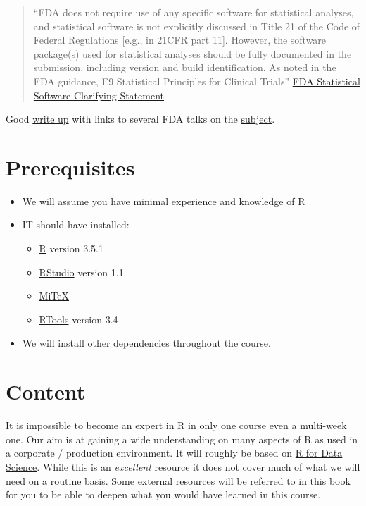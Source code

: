 \documentclass[]{book}
\providecommand{\tightlist}{%
  \setlength{\itemsep}{0pt}\setlength{\parskip}{0pt}}
\theoremstyle{definition}
\theoremstyle{definition}
\theoremstyle{definition}
\theoremstyle{remark}
\begin{document}
\begin{quote}
``FDA does not require use of any specific software for statistical
analyses, and statistical software is not explicitly discussed in Title
21 of the Code of Federal Regulations {[}e.g., in 21CFR part 11{]}.
However, the software package(s) used for statistical analyses should be
fully documented in the submission, including version and build
identification. As noted in the FDA guidance, E9 Statistical Principles
for Clinical Trials''
\href{https://www.fda.gov/downloads/forindustry/datastandards/studydatastandards/ucm587506.pdf}{FDA
Statistical Software Clarifying Statement}
\end{quote}

Good \href{http://blog.revolutionanalytics.com/2017/06/r-fda.html}{write
up} with links to several FDA talks on the
\href{https://thomaswdinsmore.com/2014/12/01/sas-versus-r-part-1/}{subject}.

\hypertarget{prerequisites}{%
\section{Prerequisites}\label{prerequisites}}

\begin{itemize}
\tightlist
\item
  We will assume you have minimal experience and knowledge of R
\item
  IT should have installed:

  \begin{itemize}
  \tightlist
  \item
    \href{https://cran.r-project.org/}{R} version 3.5.1
  \item
    \href{https://www.rstudio.com/products/rstudio/download/\#download}{RStudio}
    version 1.1
  \item
    \href{https://miktex.org/}{MiTeX}
  \item
    \href{https://cran.r-project.org/bin/windows/Rtools/}{RTools}
    version 3.4
  \end{itemize}
\item
  We will install other dependencies throughout the course.
\end{itemize}

\hypertarget{content}{%
\section{Content}\label{content}}

It is impossible to become an expert in R in only one course even a
multi-week one. Our aim is at gaining a wide understanding on many
aspects of R as used in a corporate / production environment. It will
roughly be based on \href{http://r4ds.had.co.nz}{R for Data Science}.
While this is an \emph{excellent} resource it does not cover much of
what we will need on a routine basis. Some external resources will be
referred to in this book for you to be able to deepen what you would
have learned in this course.
\end{document}
